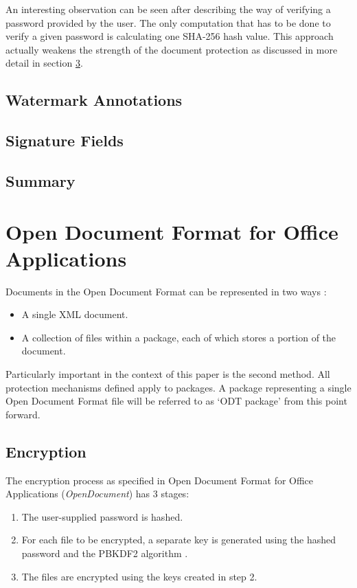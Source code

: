 \documentclass[11pt,oneside]{fithesis2}
\begin{document}
An interesting observation can be seen after describing the way of verifying a password provided by the user. The only computation that has to be done to verify a given password is calculating one SHA-256 hash value. This approach actually weakens the strength of the document protection as discussed in more detail in section \ref{pdf_summ}.

\section{Watermark Annotations}

\section{Signature Fields}

\section{Summary}\label{pdf_summ}

\chapter{Open Document Format for Office Applications}

Documents in the Open Document Format can be represented in two ways \cite{odt_spec}:

\begin{itemize}
\setlength\itemsep{0.1em}
\item{A single XML document.}
\item{A collection of files within a package, each of which stores a portion of the document.}
\end{itemize}

Particularly important in the context of this paper is the second method. All protection mechanisms defined apply to packages. A package representing a single Open Document Format file will be referred to as ‘ODT package’ from this point forward.

\section{Encryption}\label{odt_enc}

The encryption process as specified in Open Document Format for Office Applications (\textit{OpenDocument}) \cite{odt_spec} has 3 stages:

\begin{enumerate}
\setlength\itemsep{0.1em}
	\item{The user-supplied password is hashed.}
	\item{For each file to be encrypted, a separate key is generated using the hashed password and the PBKDF2 algorithm \cite{rfc2898}.}
	\item{The files are encrypted using the keys created in step 2.}
\end{enumerate}
\end{document}
